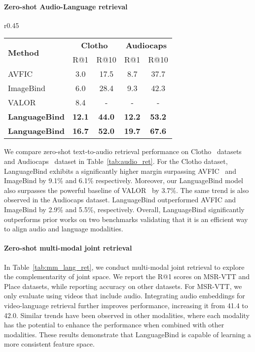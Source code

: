 \documentclass{article} \usepackage{iclr2024_conference,times}
\begin{document}
\paragraph{Zero-shot Audio-Language retrieval} 
\begin{wraptable}{r}{0.45\textwidth}
\small
\vspace{-0.4cm}
\setlength\tabcolsep{1.1mm}
\caption{\textbf{Zero-shot Audio-Language retrieval.}   donates the results of full tuning.}
\label{tab:audio_ret}
\centering
\begin{tabular}{l|cc|cc}
\toprule
    \multirow{2}{*}{\bf{Method}}  & \multicolumn{2}{c|}{\bf{Clotho}}   & \multicolumn{2}{c}{\bf{Audiocaps}} \\
    & R@1 & R@10 & R@1 & R@10 \\
    \midrule
    AVFIC   & 3.0 & 17.5 & 8.7 & 37.7 \\
    ImageBind   & 6.0 & 28.4 & 9.3 & 42.3 \\
    VALOR   & 8.4 & - & - & - \\
\textbf{LanguageBind}   & \bf{12.1} & \bf{44.0} & \bf{12.2} & \bf{53.2} \\
    \textbf{LanguageBind}   & \bf{16.7} & \bf{52.0} & \bf{19.7} & \bf{67.6} \\
    \bottomrule
\end{tabular}
\end{wraptable} We compare zero-shot text-to-audio retrieval performance on Clotho~\citep{font2013freesound} datasets and Audiocaps~\citep{kim2019audiocaps} dataset in Table~\ref{tab:audio_ret}. For the Clotho dataset, LanguageBind exhibits a significantly higher margin surpassing AVFIC~\citep{nagrani2022learning} and ImageBind by 9.1\% and 6.1\% respectively. 
Moreover, our LanguageBind model also surpasses the powerful baseline of VALOR~\citep{chen2023valor} by 3.7\%. The same trend is also observed in the Audiocaps dataset. LanguageBind outperformed AVFIC and ImageBind by 2.9\% and 5.5\%, respectively. Overall, LanguageBind significantly outperforms prior works on two benchmarks validating that it is an efficient way to align audio and language modalities.











\paragraph{Zero-shot multi-modal joint retrieval} In Table~\ref{tab:mm_lang_ret}, we conduct multi-modal joint retrieval to explore the complementarity of joint space. We report the R@1 scores on MSR-VTT and Place datasets, while reporting accuracy on other datasets. For MSR-VTT, we only evaluate using videos that include audio. Integrating audio embeddings for video-language retrieval further improves performance, increasing it from 41.4 to 42.0. Similar trends have been observed in other modalities, where each modality has the potential to enhance the performance when combined with other modalities. These results demonstrate that LanguageBind is capable of learning a more consistent feature space.
\end{document}
